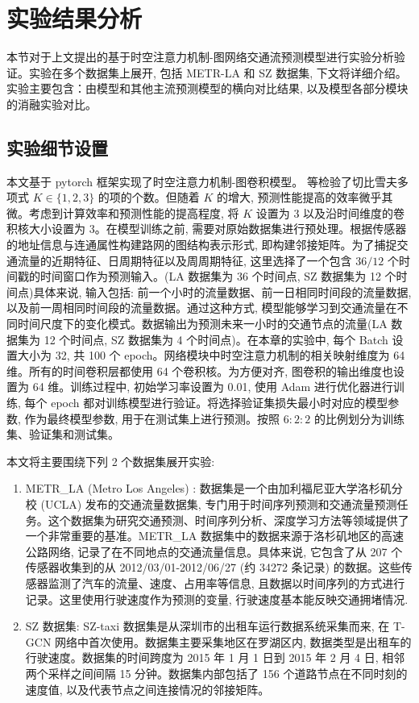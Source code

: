 \section{实验结果分析}
本节对于上文提出的基于时空注意力机制-图网络交通流预测模型进行实验分析验证。实验在多个数据集上展开, 包括 METR-LA 和 SZ 数据集, 下文将详细介绍。实验主要包含：由模型和其他主流预测模型的横向对比结果, 以及模型各部分模块的消融实验对比。

\subsection{实验细节设置}


本文基于 pytorch 框架实现了时空注意力机制-图卷积模型。\textcite{2016_Kipf_Semi_supervised_classification_with_graph_convolutionalnetworks} 等检验了切比雪夫多项式 \({K} \in  \{ 1, 2, 3\}\) 的项的个数。但随着 \({K}\) 的增大, 预测性能提高的效率微乎其微。考虑到计算效率和预测性能的提高程度, 将 \({K}\) 设置为 3 以及沿时间维度的卷积核大小设置为 3。在模型训练之前, 需要对原始数据集进行预处理。根据传感器的地址信息与连通属性构建路网的图结构表示形式, 即构建邻接矩阵。为了捕捉交通流量的近期特征、日周期特征以及周周期特征, 这里选择了一个包含 \({36}/{12}\) 个时间戳的时间窗口作为预测输入。(LA 数据集为 36 个时间点, SZ 数据集为 12 个时间点)具体来说, 输入包括: 前一个小时的流量数据、前一日相同时间段的流量数据, 以及前一周相同时间段的流量数据。通过这种方式, 模型能够学习到交通流量在不同时间尺度下的变化模式。数据输出为预测未来一小时的交通节点的流量(LA 数据集为 12 个时间点, SZ 数据集为 4 个时间点)。在本章的实验中, 每个 Batch 设置大小为 32, 共 100 个 epoch。网络模块中时空注意力机制的相关映射维度为 64 维。所有的时间卷积层都使用 64 个卷积核。为方便对齐, 图卷积的输出维度也设置为 64 维。训练过程中, 初始学习率设置为 0.01, 使用 Adam 进行优化器进行训练, 每个 epoch 都对训练模型进行验证。将选择验证集损失最小时对应的模型参数, 作为最终模型参数, 用于在测试集上进行预测。按照 $6:2:2$ 的比例划分为训练集、验证集和测试集。

本文将主要围绕下列 2 个数据集展开实验:

\begin{enumerate}[(1)]
  \item METR\_LA (Metro Los Angeles) : 数据集是一个由加利福尼亚大学洛杉矶分校 (UCLA) 发布的交通流量数据集, 专门用于时间序列预测和交通流量预测任务。这个数据集为研究交通预测、时间序列分析、深度学习方法等领域提供了一个非常重要的基准。METR\_LA 数据集中的数据来源于洛杉矶地区的高速公路网络, 记录了在不同地点的交通流量信息。具体来说, 它包含了从 207 个传感器收集到的从 2012/03/01-2012/06/27 (约 34272 条记录) 的数据。这些传感器监测了汽车的流量、速度、占用率等信息, 且数据以时间序列的方式进行记录。这里使用行驶速度作为预测的变量, 行驶速度基本能反映交通拥堵情况.

  \item SZ 数据集: SZ-taxi 数据集是从深圳市的出租车运行数据系统采集而来, 在 T-GCN 网络中首次使用。数据集主要采集地区在罗湖区内, 数据类型是出租车的行驶速度。数据集的时间跨度为 2015 年 1 月 1 日到 2015 年 2 月 4 日, 相邻两个采样之间间隔 15 分钟。数据集内部包括了 156 个道路节点在不同时刻的速度值, 以及代表节点之间连接情况的邻接矩阵。
\end{enumerate}

